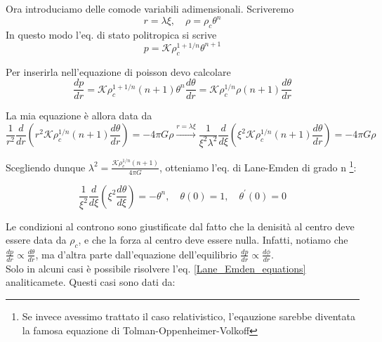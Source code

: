 \documentclass{report}
\begin{document}
Ora introduciamo delle comode variabili adimensionali. Scriveremo 
\begin{equation}
    r = \lambda\xi , \quad \rho = \rho_c \theta^n
\end{equation}
In questo modo l'eq. di stato politropica si scrive
\begin{equation}
    p = \mathcal{K}\rho_c^{1+1/n}\theta^{n+1}
\end{equation}

Per inserirla nell'equazione di poisson devo calcolare 
\begin{equation}
    \frac{dp}{dr} = \mathcal{K}\rho_c^{1 +1/n}(n+1)\theta^n\frac{d\theta}{dr} = \mathcal{K}\rho_c^{1/n}\rho(n+1)\frac{d\theta}{dr}
\end{equation}

La mia equazione è allora data da 
\begin{equation}
    \frac{1}{r^2}\frac{d}{dr}\left(r^2\mathcal{K}\rho_c^{1/n}(n+1)\frac{d\theta}{dr}\right) = -4\pi G \rho \xrightarrow{r =\lambda\xi} \frac{1}{\xi^2\lambda^2}\frac{d}{d\xi}\left( \xi^2\mathcal{K}\rho_c^{1/n}(n+1)\frac{d\theta}{dr}\right) = -4\pi G \rho
\end{equation}

Scegliendo dunque $\lambda^2 = \frac{\mathcal{K}\rho_c^{1/n}(n+1)}{4\pi G}$, otteniamo l'eq. di Lane-Emden di grado n \footnote{Se invece avessimo trattato il caso relativistico, l'eqauzione sarebbe diventata la famosa equazione di Tolman-Oppenheimer-Volkoff}: 
\begin{tcolorbox}[colback=myg!15, colframe=black, boxrule=1pt]
\begin{equation}
    \label{Lane_Emden_equations}
    \frac{1}{\xi^2}\frac{d}{d\xi}\left(\xi^2\frac{d\theta}{d\xi} \right) = -\theta^n , \quad \theta(0) = 1, \quad \theta^{'}(0) = 0
\end{equation}
\end{tcolorbox}

Le condizioni al controno sono giustificate dal fatto che la denisità al centro deve essere data da $\rho_c$, e che la forza al centro deve essere nulla. Infatti, notiamo che $\frac{dp}{dr} \propto \frac{d\theta}{dr}$, ma d'altra parte dall'equazione dell'equilibrio $\frac{dp}{dr} \propto \frac{d\phi}{dr}$. \\

Solo in alcuni casi è possibile risolvere l'eq. \ref{Lane_Emden_equations} analiticamete. Questi casi sono dati da: 
\end{document}

